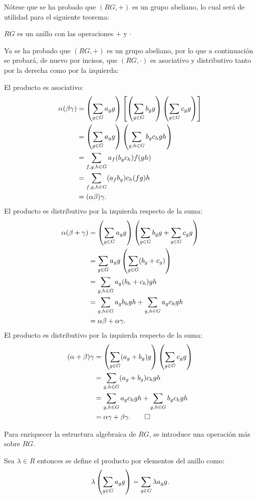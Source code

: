 Nótese que se ha probado que $(RG,+)$ es un grupo abeliano, lo cual será de utilidad para el siguiente teorema:
\begin{teorema}
$RG$ es un anillo con las operaciones $+$ y $\cdot$
\end{teorema}
\begin{proof*}
Ya se ha probado que $(RG,+)$ es un grupo abeliano, por lo que a continuación se probará, de nuevo por incisos, que $(RG,\cdot)$ es asociativo y distributivo tanto por la derecha como por la izquierda:
\begin{bulletList}
\newItem El producto es asociativo:
\begin{align*}
\alpha(\beta\gamma) &=\left(\sum_{g \in G} a_{g} g\right)\left[\left(\sum_{g \in G} b_{g} g\right)\left(\sum_{g \in G} c_{g} g\right)\right]\\ 
& = \left(\sum_{g \in G} a_{g} g\right)\left(\sum_{g,h\in G}b_gc_hgh\right)\\
&= \sum_{f,g,h \in G}a_f(b_gc_h)f(gh)\\ 
&=  \sum_{f,g,h \in G} (a_fb_g)c_h(fg)h\\
&= (\alpha\beta)\gamma.
\end{align*} 
\newItem  El producto es distributivo por la izquierda respecto de la suma:
\begin{align*}
\alpha(\beta + \gamma) &= \left( \sum_{g \in G} a_{g} g \right) \left(\sum_{g \in G} b_{g} g + \sum_{g \in G} c_{g} g \right) \\
&= \sum_{g \in G} a_{g} g \left( \sum_{g \in G}(b_g+c_g)\right)\\ 
&= \sum_{g,h \in G}a_g(b_h+c_h)gh\\  
&= \sum_{g,h \in G} a_gb_hgh + \sum_{g,h \in G} a_gc_hgh\\ &= \alpha\beta + \alpha\gamma.
\end{align*}  
\newItem El producto es distributivo por la izquierda respecto de la suma:
\begin{align*}
(\alpha + \beta)\gamma &= \left( \sum_{g\in G}(a_g+b_g)g\right) \left(\sum_{g \in G} c_{g} g\right)\\
&= \sum_{g,h \in G} (a_g+b_g)c_hgh\\ 
&= \sum_{g,h \in G}a_gc_hgh + \sum_{g,h\in G}b_gc_hgh\\ &= \alpha\gamma + \beta\gamma.\qedhere
\end{align*}
\end{bulletList}
\end{proof*}
Para enriquecer la estructura algebraica de $RG$, se introduce una operación más sobre $RG$.
\begin{definicion}
Sea $\lambda \in R$ entonces se define el producto por elementos del anillo como: 
\begin{equation}
\lambda \left(\sum_{g \in G} a_{g} g\right) = \sum_{g \in G} \lambda a_{g} g.
\end{equation}
\end{definicion}
